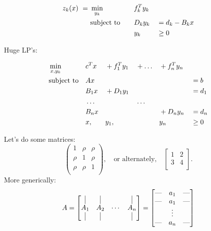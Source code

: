\documentclass[12pt]{article}
\begin{document}
\begin{alignat*}{4}
z_k(x) \ = \ & \min_{y_k}        &       &  f_k^T y_k &&                  \notag \\
             & \text{subject to} & \quad &  D_k y_k   &&  = d_k - B_k x  \notag \\
             &                   &       &  y_k       && \geq 0          \notag \\
\end{alignat*}

Huge LP's:

\begin{align}
    & \min_{x, y_k}     &&  c^T x && + f_1^T y_1 && + \dots && + f_n^T y_n  &&  \notag \\
    & \text{subject to} &&  Ax    &&             &&         &&              && = b \notag \\
    &                   &&  B_1 x && + D_1 y_1   &&         &&              && = d_1 \notag \\
    &                   &&  \dots &&             &&  \dots  &&              &&       \notag \\
    &                   &&  B_n x &&             &&         && + D_n y_n    && = d_n \notag \\
    &                   &&   x,   &&     y_1,    &&         &&       y_n    && \geq 0 \notag \\
\end{align}


Let's do some matrices:
\[
\begin{pmatrix}
    1 & \rho & \rho\\
    \rho & 1 & \rho\\
    \rho & \rho & 1\\
\end{pmatrix},
\quad \text{or alternately,} \quad
\begin{bmatrix}
    1 & 2 \\
    3 & 4 \\
\end{bmatrix}.
\]
More generically:
\[
    A = \begin{bmatrix}
            \vrule & \vrule & & \vrule\\
            A_{1} & A_{2} & \cdots & A_{n} \\
            \vrule & \vrule & & \vrule
        \end{bmatrix}
      = \begin{bmatrix}
            \text{---} & a_1 & \text{---} \\
            \text{---} & a_1 & \text{---} \\
                       & \vdots &  \\
            \text{---} & a_n & \text{---} 
        \end{bmatrix}
\]
\end{document}
